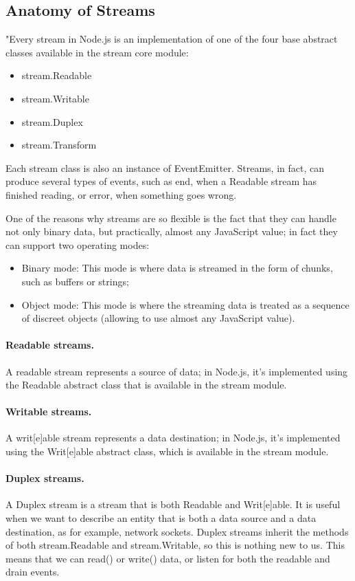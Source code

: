 \subsection{Anatomy of Streams}
"Every stream in Node.js is an implementation of one of the four base abstract classes available in the stream core module:

\begin{itemize}
\item stream.Readable
\item stream.Writable
\item stream.Duplex
\item stream.Transform
\end{itemize}

Each stream class is also an instance of EventEmitter. 
Streams, in fact, can produce several types of events, such as end, when a Readable stream has finished reading, or error, when something goes wrong.

One of the reasons why streams are so flexible is the fact that they can handle not only binary data, but practically, almost any JavaScript value; in fact they can support two operating modes:
\begin{itemize}
\item Binary mode: This mode is where data is streamed in the form of chunks, such as buffers or strings;
\item Object mode: This mode is where the streaming data is treated as a sequence of discreet objects (allowing to use almost any JavaScript value).
\end{itemize}

\paragraph{Readable streams.}
A readable stream represents a source of data; in Node.js, it's implemented using the Readable abstract class that is available in the stream module.

\paragraph{Writable streams.}
A writ[e]able stream represents a data destination; in Node.js, it's implemented using the Writ[e]able abstract class, which is available in the stream module.

\paragraph{Duplex streams.}
A Duplex stream is a stream that is both Readable and Writ[e]able.
It is useful when we want to describe an entity that is both a data source and a data destination, as for example, network sockets. 
Duplex streams inherit the methods of both stream.Readable and stream.Writable, so this is nothing new to us. 
This means that we can read() or write() data, or listen for both the readable and drain events.

